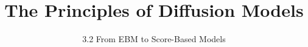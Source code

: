 
\title{The Principles of Diffusion Models}
\subtitle{3.2 From EBM to Score-Based Models}


\begin{frame}
    \titlepage
\end{frame}


